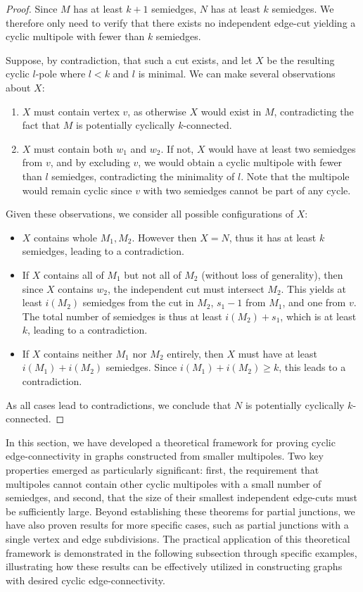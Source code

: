 \documentclass[12pt, twoside]{book}
\begin{document}
\begin{proof}
	Since $M$ has at least $k+1$ semiedges, $N$ has at least $k$ semiedges. We therefore only need to verify that there exists no independent edge-cut yielding a cyclic multipole with fewer than $k$ semiedges.
	
	Suppose, by contradiction, that such a cut exists, and let $X$ be the resulting cyclic $l$-pole where $l<k$ and $l$ is minimal. We can make several observations about $X$:
	\begin{enumerate}[label=(\roman*)]
		\item $X$ must contain vertex $v$, as otherwise $X$ would exist in $M$, contradicting the fact that $M$ is potentially cyclically $k$-connected.
		\item $X$ must contain both $w_1$ and $w_2$. If not, $X$ would have at least two semiedges from $v$, and by excluding $v$, we would obtain a cyclic multipole with fewer than $l$ semiedges, contradicting the minimality of $l$. Note that the multipole would remain cyclic since $v$ with two semiedges cannot be part of any cycle.
	\end{enumerate}
	
	Given these observations, we consider all possible configurations of $X$:
	\begin{itemize}
		\item $X$ contains whole $M_1,M_2$. However then $X=N$, thus it has at least $k$ semiedges, leading to a contradiction.
		\item If $X$ contains all of $M_1$ but not all of $M_2$ (without loss of generality), then since $X$ contains $w_2$, the independent cut must intersect $M_2$. This yields at least $i(M_2)$ semiedges from the cut in $M_2$, $s_1-1$ from $M_1$, and one from $v$. The total number of semiedges is thus at least $i(M_2)+s_1$, which is at least $k$, leading to a contradiction.
		\item If $X$ contains neither $M_1$ nor $M_2$ entirely, then $X$ must have at least $i(M_1)+i(M_2)$ semiedges. Since $i(M_1)+i(M_2)\geq k$, this leads to a contradiction.
	\end{itemize}

	As all cases lead to contradictions, we conclude that $N$ is potentially cyclically $k$-connected.
\end{proof}

In this section, we have developed a theoretical framework for proving cyclic \mbox{edge-connectivity} in graphs constructed from smaller multipoles. Two key properties emerged as particularly significant: first, the requirement that multipoles cannot contain other cyclic multipoles with a small number of semiedges, and second, that the size of their smallest independent edge-cuts must be sufficiently large. Beyond establishing these theorems for partial junctions, we have also proven results for more specific cases, such as partial junctions with a single vertex and edge subdivisions. The practical application of this theoretical framework is demonstrated in the following subsection through specific examples, illustrating how these results can be effectively utilized in constructing graphs with desired cyclic edge-connectivity.
\end{document}
